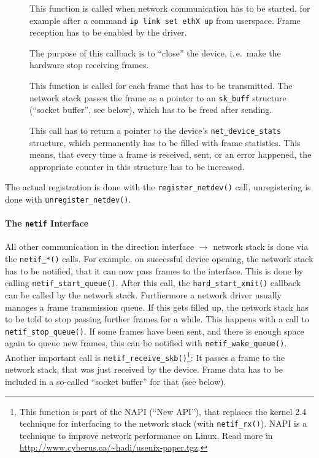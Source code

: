 \documentclass[a4paper,12pt,BCOR6mm,bibtotoc,idxtotoc]{scrbook}
\begin{document}
\begin{description}

\item[\usebox\boxopen] This function is called when network communication has
to be started, for example after a command \lstinline+ip link set ethX up+
from userspace. Frame reception has to be enabled by the driver.

\item[\usebox\boxstop] The purpose of this callback is to ``close'' the
device, i.\,e.\ make the hardware stop receiving frames.

\item[\usebox\boxxmit] This function is called for each frame that has to be
transmitted. The network stack passes the frame as a pointer to an
\lstinline+sk_buff+ structure (``socket buffer'', see
below), which has to be freed after sending.

\item[\usebox\boxstats] This call has to return a pointer to the device's
\lstinline+net_device_stats+ structure, which permanently has to be filled with
frame statistics. This means, that every time a frame is received, sent, or an
error happened, the appropriate counter in this structure has to be increased.

\end{description}

The actual registration is done with the \lstinline+register_netdev()+ call,
unregistering is done with \lstinline+unregister_netdev()+.

\paragraph{The \lstinline+netif+ Interface}

All other communication in the direction interface $\to$ network stack is done
via the \lstinline+netif_*()+ calls. For example, on successful device opening,
the network stack has to be notified, that it can now pass frames to the
interface. This is done by calling \lstinline+netif_start_queue()+. After this
call, the \lstinline+hard_start_xmit()+ callback can be called by the network
stack. Furthermore a network driver usually manages a frame transmission queue.
If this gets filled up, the network stack has to be told to stop passing
further frames for a while. This happens with a call to
\lstinline+netif_stop_queue()+. If some frames have been sent, and there is
enough space again to queue new frames, this can be notified with
\lstinline+netif_wake_queue()+. Another important call is
\lstinline+netif_receive_skb()+\footnote{This function is part of the NAPI
(``New API''), that replaces the kernel 2.4 technique for interfacing to the
network stack (with \lstinline+netif_rx()+). NAPI is a technique to improve
network performance on Linux. Read more in
\url{http://www.cyberus.ca/~hadi/usenix-paper.tgz}.}: It passes a frame to the
network stack, that was just received by the device. Frame data has to be
included in a so-called ``socket buffer'' for that (see below).
\end{document}
